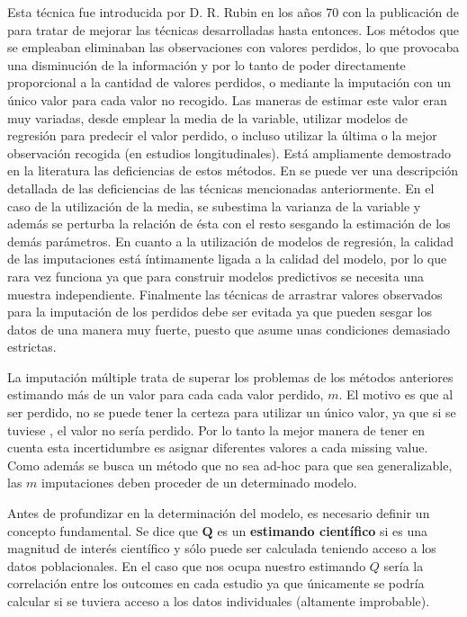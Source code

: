 \documentclass[a4paper,openright,12pt]{report}
\begin{document}
Esta técnica fue introducida por D. R. Rubin en los años 70 con la publicación de \cite{Rubin1978}\cite{Rubin1978_2} para tratar de mejorar las técnicas desarrolladas hasta entonces. Los métodos que se empleaban eliminaban las observaciones con valores perdidos, lo que provocaba una disminución de la información y por lo tanto de poder directamente proporcional a la cantidad de valores perdidos, o mediante la imputación con un único valor para cada valor no recogido.
Las maneras de estimar este valor eran muy variadas, desde emplear la media de la variable, utilizar modelos de regresión para predecir el valor perdido, o incluso utilizar la última o la mejor observación recogida (en estudios longitudinales). Está ampliamente demostrado en la literatura las deficiencias de estos métodos. En \cite{VanBuuren2012} se puede ver una descripción detallada de las deficiencias de las técnicas mencionadas anteriormente. En el caso de la utilización de la media, se subestima la varianza de la variable y además se perturba la relación de ésta con el resto sesgando la estimación de los demás parámetros. En cuanto a la utilización de modelos de regresión, la calidad de las imputaciones está íntimamente ligada a la calidad del modelo, por lo que rara vez funciona ya que para construir modelos predictivos se necesita una muestra independiente. Finalmente las técnicas de arrastrar valores observados para la imputación de los perdidos debe ser evitada ya que pueden sesgar los datos de una manera muy fuerte, puesto que asume unas condiciones demasiado estrictas.

La imputación múltiple trata de superar los problemas de los métodos anteriores estimando más de un valor para cada cada valor perdido, $m$. El motivo es que al ser perdido, no se puede tener la certeza para utilizar un único valor, ya que si se tuviese , el valor no sería perdido. Por lo tanto la mejor manera de tener en cuenta esta incertidumbre es asignar diferentes valores a cada missing value. Como además se busca un método que no sea ad-hoc para que sea generalizable, las $m$ imputaciones deben proceder de un determinado modelo\cite{Rubin1978_3}.

Antes de profundizar en la determinación del modelo, es necesario definir un concepto fundamental. Se dice que $\boldsymbol{Q}$ es un \textbf{estimando científico} si es una magnitud de interés científico y sólo puede ser calculada teniendo acceso a los datos poblacionales. En el caso que nos ocupa nuestro estimando $Q$ sería la correlación entre los outcomes en cada estudio ya que únicamente se podría calcular si se tuviera acceso a los datos individuales (altamente improbable). 
\end{document}
